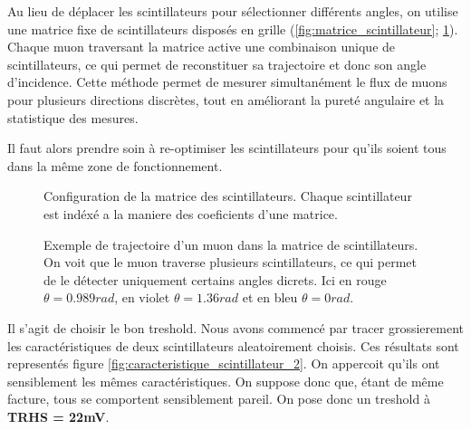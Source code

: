 \documentclass[a4paper,12pt,twoside]{article}
\begin{document}
\begin{center}
\begin{tcolorbox}[colback=blue!5!white, colframe=blue!60!black, title=Principe de la matrice de scintillateurs]
Au lieu de déplacer les scintillateurs pour sélectionner différents angles, on utilise une matrice fixe de scintillateurs disposés en grille (\ref{fig:matrice_scintillateur}; \ref{fig:matrice_scintillateur_2}). Chaque muon traversant la matrice active une combinaison unique de scintillateurs, ce qui permet de reconstituer sa trajectoire et donc son angle d’incidence. Cette méthode permet de mesurer simultanément le flux de muons pour plusieurs directions discrètes, tout en améliorant la pureté angulaire et la statistique des mesures.
\end{tcolorbox}
\end{center}

Il faut alors prendre soin à re-optimiser les scintillateurs pour qu'ils soient tous dans la même zone de fonctionnement.

\begin{figure}[!h]
  \begin{minipage}
  {0.45\textwidth}
    \centering
    
    \caption{Configuration de la matrice des scintillateurs. Chaque scintillateur est indéxé a la maniere des coeficients d'une matrice.}
    \label{fig:matrice_scintillateur}
  \end{minipage}
  \hfill
  \begin{minipage}{0.45\textwidth}
    \centering
    
    \caption{Exemple de trajectoire d'un muon dans la matrice de scintillateurs.\\On voit que le muon traverse plusieurs scintillateurs, ce qui permet de le détecter uniquement certains angles dicrets. Ici en rouge $\theta = 0.989 rad$, en violet $\theta = 1.36 rad$ et en bleu $\theta = 0 rad$.}
    \label{fig:matrice_scintillateur_2}
  \end{minipage}
\end{figure}

Il s'agit de choisir le bon treshold. Nous avons commencé par tracer grossierement les caractéristiques de deux scintillateurs aleatoirement choisis. Ces résultats sont representés figure \ref{fig:caracteristique_scintillateur_2}.
 On appercoit qu'ils ont sensiblement les mêmes caractéristiques. On suppose donc que, étant de  même facture, tous se comportent sensiblement pareil. On pose donc un treshold à \textbf{TRHS = 22mV}.
\end{document}
